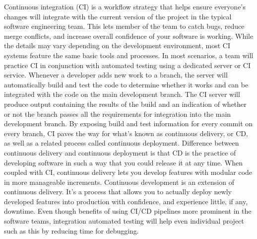 Continuous integration (CI) is a workflow strategy that helps ensure everyone's changes will integrate with the current version of the project in the typical software engineering team. This lets member of the team to catch bugs, reduce merge conflicts, and increase overall confidence of your software is working. While the details may vary depending on the development environment, most CI systems feature the same basic tools and processes. In most scenarios, a team will practice CI in conjunction with automated testing using a dedicated server or CI service. Whenever a developer adds new work to a branch, the server will automatically build and test the code to determine whether it works and can be integrated with the code on the main development branch. The CI server will produce output containing the results of the build and an indication of whether or not the branch passes all the requirements for integration into the main development branch. By exposing build and test information for every commit on every branch, CI paves the way for what's known as continuous delivery, or CD, as well as a related process called continuous deployment. Difference between continuous delivery and continuous deployment is that CD is the practice of developing software in such a way that you could release it at any time. When coupled with CI, continuous delivery lets you develop features with modular code in more manageable increments. Continuous development is an extension of continuous delivery. It's a process that allows you to actually deploy newly developed features into production with confidence, and experience little, if any, downtime. Even though benefits of using CI/CD pipelines more prominent in the software teams, integration automated testing will help even individual project such as this by reducing time for debugging.

